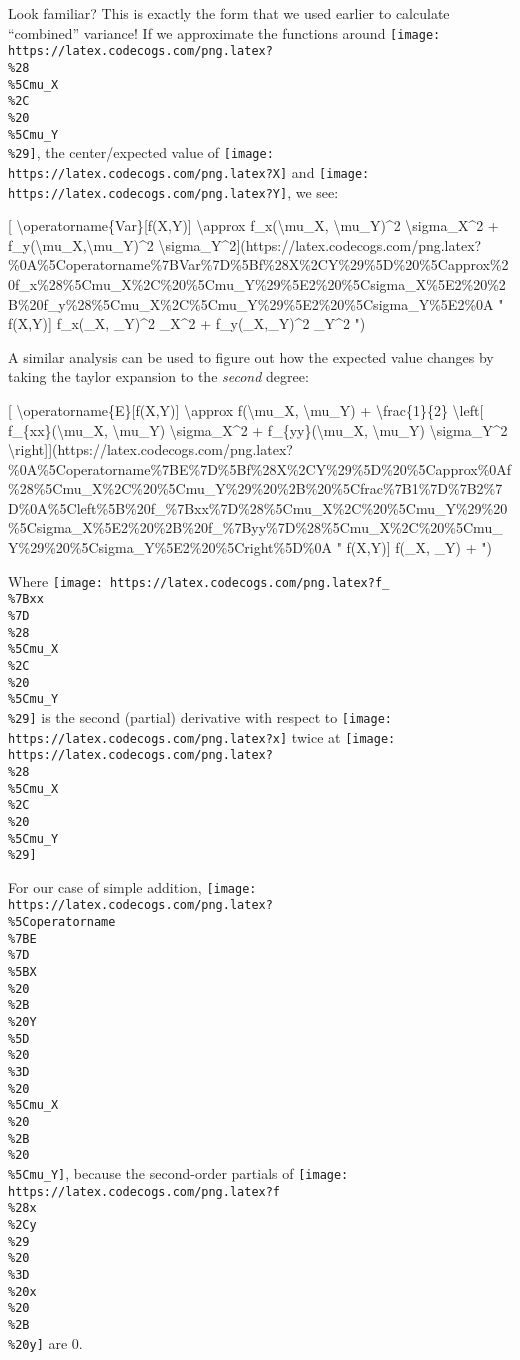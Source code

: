 \documentclass[]{article}
\begin{document}
Look familiar? This is exactly the form that we used earlier to calculate
``combined'' variance! If we approximate the functions around
\texttt{[image: https://latex.codecogs.com/png.latex?\\\%28\\\%5Cmu\_X\\\%2C\\\%20\\\%5Cmu\_Y\\\%29]},
the center/expected value of
\texttt{[image: https://latex.codecogs.com/png.latex?X]} and
\texttt{[image: https://latex.codecogs.com/png.latex?Y]}, we see:

{[} \textbackslash{}operatorname\{Var\}{[}f(X,Y){]} \textbackslash{}approx
f\_x(\textbackslash{}mu\_X, \textbackslash{}mu\_Y)\^{}2
\textbackslash{}sigma\_X\^{}2 +
f\_y(\textbackslash{}mu\_X,\textbackslash{}mu\_Y)\^{}2
\textbackslash{}sigma\_Y\^{}2{]}(https://latex.codecogs.com/png.latex?\%0A\%5Coperatorname\%7BVar\%7D\%5Bf\%28X\%2CY\%29\%5D\%20\%5Capprox\%20f\_x\%28\%5Cmu\_X\%2C\%20\%5Cmu\_Y\%29\%5E2\%20\%5Csigma\_X\%5E2\%20\%2B\%20f\_y\%28\%5Cmu\_X\%2C\%5Cmu\_Y\%29\%5E2\%20\%5Csigma\_Y\%5E2\%0A
" \operatorname{Var}{[}f(X,Y){]} \approx f\_x(\mu\_X, \mu\_Y)\^{}2
\sigma\_X\^{}2 + f\_y(\mu\_X,\mu\_Y)\^{}2 \sigma\_Y\^{}2 ")

A similar analysis can be used to figure out how the expected value changes by
taking the taylor expansion to the \emph{second} degree:

{[} \textbackslash{}operatorname\{E\}{[}f(X,Y){]} \textbackslash{}approx
f(\textbackslash{}mu\_X, \textbackslash{}mu\_Y) + \textbackslash{}frac\{1\}\{2\}
\textbackslash{}left{[} f\_\{xx\}(\textbackslash{}mu\_X, \textbackslash{}mu\_Y)
\textbackslash{}sigma\_X\^{}2 + f\_\{yy\}(\textbackslash{}mu\_X,
\textbackslash{}mu\_Y) \textbackslash{}sigma\_Y\^{}2
\textbackslash{}right{]}{]}(https://latex.codecogs.com/png.latex?\%0A\%5Coperatorname\%7BE\%7D\%5Bf\%28X\%2CY\%29\%5D\%20\%5Capprox\%0Af\%28\%5Cmu\_X\%2C\%20\%5Cmu\_Y\%29\%20\%2B\%20\%5Cfrac\%7B1\%7D\%7B2\%7D\%0A\%5Cleft\%5B\%20f\_\%7Bxx\%7D\%28\%5Cmu\_X\%2C\%20\%5Cmu\_Y\%29\%20\%5Csigma\_X\%5E2\%20\%2B\%20f\_\%7Byy\%7D\%28\%5Cmu\_X\%2C\%20\%5Cmu\_Y\%29\%20\%5Csigma\_Y\%5E2\%20\%5Cright\%5D\%0A
" \operatorname{E}{[}f(X,Y){]} \approx f(\mu\_X, \mu\_Y) + 
")

Where
\texttt{[image: https://latex.codecogs.com/png.latex?f\_\\\%7Bxx\\\%7D\\\%28\\\%5Cmu\_X\\\%2C\\\%20\\\%5Cmu\_Y\\\%29]}
is the second (partial) derivative with respect to
\texttt{[image: https://latex.codecogs.com/png.latex?x]} twice at
\texttt{[image: https://latex.codecogs.com/png.latex?\\\%28\\\%5Cmu\_X\\\%2C\\\%20\\\%5Cmu\_Y\\\%29]}

For our case of simple addition,
\texttt{[image: https://latex.codecogs.com/png.latex?\\\%5Coperatorname\\\%7BE\\\%7D\\\%5BX\\\%20\\\%2B\\\%20Y\\\%5D\\\%20\\\%3D\\\%20\\\%5Cmu\_X\\\%20\\\%2B\\\%20\\\%5Cmu\_Y]},
because the second-order partials of
\texttt{[image: https://latex.codecogs.com/png.latex?f\\\%28x\\\%2Cy\\\%29\\\%20\\\%3D\\\%20x\\\%20\\\%2B\\\%20y]}
are 0.
\end{document}
